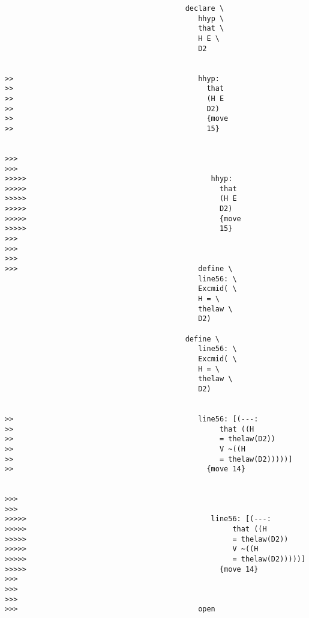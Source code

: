 \documentclass[12pt]{article}
\begin{document}
\begin{verbatim}
                                          declare \
                                             hhyp \
                                             that \
                                             H E \
                                             D2


>>                                           hhyp:
>>                                             that
>>                                             (H E
>>                                             D2)
>>                                             {move
>>                                             15}


>>>
>>>
>>>>>                                           hhyp:
>>>>>                                             that
>>>>>                                             (H E
>>>>>                                             D2)
>>>>>                                             {move
>>>>>                                             15}
>>>
>>>
>>>
>>>                                          define \
                                             line56: \
                                             Excmid( \
                                             H = \
                                             thelaw \
                                             D2)

                                          define \
                                             line56: \
                                             Excmid( \
                                             H = \
                                             thelaw \
                                             D2)


>>                                           line56: [(---:
>>                                                that ((H
>>                                                = thelaw(D2))
>>                                                V ~((H
>>                                                = thelaw(D2)))))]
>>                                             {move 14}


>>>
>>>
>>>>>                                           line56: [(---:
>>>>>                                                that ((H
>>>>>                                                = thelaw(D2))
>>>>>                                                V ~((H
>>>>>                                                = thelaw(D2)))))]
>>>>>                                             {move 14}
>>>
>>>
>>>
>>>                                          open


\end{verbatim}
\end{document}
